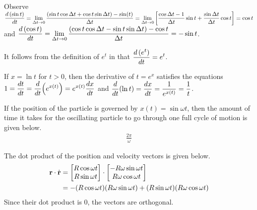 \begin{answer}[Trigonometry]
	Observe $\displaystyle \frac{d\left(\sin t\right)}{dt} = \lim_{\Delta t \to 0} \frac{\left(\sin t \cos \Delta t + \cos t \sin \Delta t\right) - \sin(t)}{\Delta t} = \lim_{\Delta t \to 0} \left[\frac{\cos \Delta t - 1}{\Delta t} \sin t + \frac{\sin \Delta t}{\Delta t} \cos t\right] = \cos t$ and $\displaystyle \frac{d\left(\cos t\right)}{dt} = \lim_{\Delta t \to 0} \frac{\left(\cos t \cos \Delta t - \sin t \sin \Delta t\right) - \cos t}{\Delta t} = - \sin t$.

	It follows from the definition of $e^t$ in \cite[p. 34]{TM} that $\displaystyle \frac{d\left(e^t\right)}{dt} = e^t$.

	If $x = \ln t$ for $t>0$, then the derivative of $t = e^x$ satisfies the equations $\displaystyle 1 = \frac{dt}{dt} = \frac{d}{dt}\!\left(e^{x(t)}\right) = e^{x(t)} \frac{dx}{dt}$ and $\displaystyle \frac{d}{dt}\!\left(\ln t\right) = \frac{dx}{dt} = \frac{1}{e^{x(t)}} = \frac{1}{t}$.
\end{answer}

\begin{answer}[Period]
	If the position of the particle is governed by $x(t) = \sin \omega t$, then the amount of time it takes for the oscillating particle to go through one full cycle of motion is given below.
	\begin{align}
		\frac{2 \pi}{\omega}
	\end{align}
\end{answer}

\begin{answer}
	The dot product of the position and velocity vectors is given below.
	\begin{align}
		\mathbf{r} \cdot \dot{\mathbf{r}}
		 & =
		\begin{bmatrix}
			R \cos \omega t \\
			R \sin \omega t
		\end{bmatrix}
		\cdot
		\begin{bmatrix}
			-R \omega \sin \omega t \\
			R \omega \cos \omega t
		\end{bmatrix} \nonumber \\
		 & =
		- (R \cos \omega t)(R \omega \sin \omega t) + (R \sin \omega t)(R \omega \cos \omega t)
	\end{align}
	Since their dot product is $0$, the vectors are orthogonal.
\end{answer}

